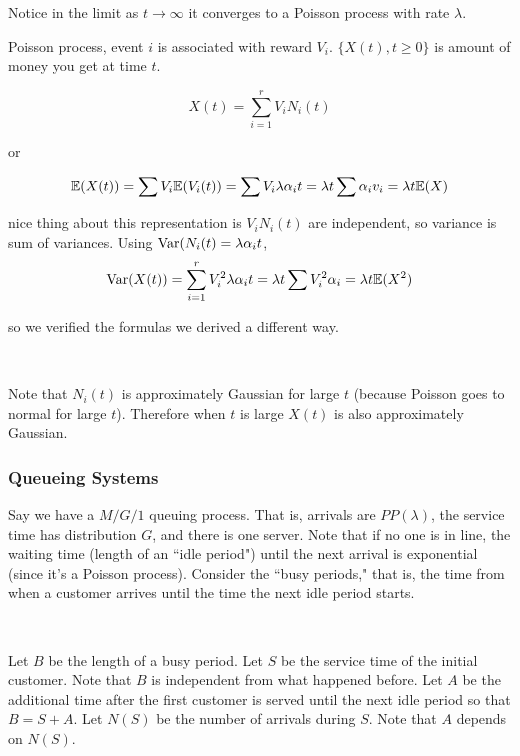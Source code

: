 \begin{remark}
Notice in the limit as \(t \to \infty\) it converges to a Poisson process with rate \(\lambda\).
\end{remark}

\begin{example}
Poisson process, event \(i\) is associated with reward \(V_i\). \(\{X(t), t \geq 0 \} \) is amount of money you get at time \(t\).

\begin{equation}
X(t) = \sum_{i=1}^r V_i N_i(t)
\end{equation}

or

\[
\E(X(t)) = \sum V_i \E(V_i (t)) = \sum V_i \lambda \alpha_i t = \lambda t \sum \alpha_i v_i = \lambda t \E(X)
\]

nice thing about this representation is \(V_i N_i(t)\) are independent, so variance is sum of variances. Using \(\Var(N_i(t) =  \lambda \alpha_i t\), 
\[
\Var(X(t)) = \sum_{i=1}^r V_i^2 \lambda \alpha_i t = \lambda t \sum V_i^2 \alpha_i = \lambda t \E(X^2)
\]

so we verified the formulas we derived a different way.

\

Note that \(N_i(t)\) is approximately Gaussian for large \(t\) (because Poisson goes to normal for large \(t\)). Therefore when \(t\) is large \(X(t)\) is also approximately Gaussian.

\end{example}

\subsubsection{Queueing Systems}

Say we have a \(M/G/1\) queuing process. That is, arrivals are \(PP(\lambda)\), the service time has distribution \(G\), and there is one server. Note that if no one is in line, the waiting time  (length of an ``idle period") until the next arrival is exponential (since it's a Poisson process). Consider the ``busy periods," that is, the time from when a customer arrives until the time the next idle period starts. 

\

Let \(B\) be the length of a busy period. Let \(S\) be the service time of the initial customer. Note that \(B\) is independent from what happened before. Let \(A\) be the additional time after the first customer is served until the next idle period so that \(B = S + A\). Let \(N(S)\) be the number of arrivals during \(S\). Note that \(A\) depends on \(N(S)\).

